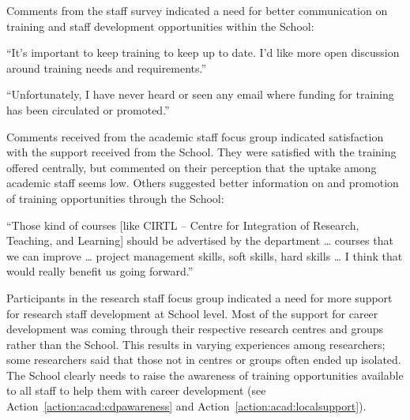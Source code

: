 Comments from the staff survey indicated a need for better communication on training and staff development opportunities within the School:

\begin{myquote}
``It's important to keep training to keep up to date. I'd like more open discussion around training needs and requirements.''
\end{myquote}

\begin{myquote}
“Unfortunately, I have never heard or seen any email where funding for training has been circulated or promoted.''
\end{myquote}

Comments received from the academic staff focus group indicated satisfaction  %
with the support received from the School. They were satisfied with the training offered centrally, but commented on their perception that the uptake among academic staff seems low. Others suggested better information on and promotion of training opportunities through the School:

\begin{myquote}
``Those kind of courses [like CIRTL – Centre for Integration of Research, Teaching, and Learning] should be advertised by the department … courses that we can improve … project management skills, soft skills, hard skills … I think that would really benefit us going forward.''
\end{myquote}

Participants in the research staff focus group indicated a need for more support for research staff development at School level. 
Most of the support for career development was coming through their respective research centres and groups rather than the School. 
This results in varying experiences among researchers; some researchers said that those not in centres or groups often ended up isolated. The School clearly needs to raise the awareness of training opportunities available to all staff to help them with career development (see Action~\ref{action:acad:cdpawareness} and Action~\ref{action:acad:localsupport}).

